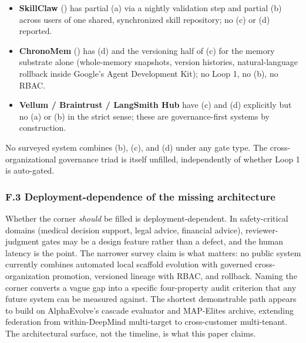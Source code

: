 \documentclass[
]{article}
\begin{document}
\begin{itemize}
  federation operator) exchange semantic skill diffs, and a server-side
  evolution agent applies, adapts, or rejects each patch per client;
  partial (c) via an auditable decision log recording source patch,
  reward, and justification per modified path; no RBAC, no (d).
\item
  \textbf{SkillClaw} ()
  has partial (a) via a nightly validation step and partial (b) across
  users of one shared, synchronized skill repository; no (c) or (d)
  reported.
\item
  \textbf{ChronoMem} ()
  has (d) and the versioning half of (c) for the memory substrate alone
  (whole-memory snapshots, version histories, natural-language rollback
  inside Google's Agent Development Kit); no Loop 1, no (b), no RBAC.
\item
  \textbf{Vellum / Braintrust / LangSmith Hub} have (c) and (d)
  explicitly but no (a) or (b) in the strict sense; these are
  governance-first systems by construction.
\end{itemize}

No surveyed system combines (b), (c), and (d) under any gate type. The
cross-organizational governance triad is itself unfilled, independently
of whether Loop 1 is auto-gated.

\subsubsection{F.3 Deployment-dependence of the missing
architecture}\label{f.3-deployment-dependence-of-the-missing-architecture}

Whether the corner \emph{should} be filled is deployment-dependent. In
safety-critical domains (medical decision support, legal advice,
financial advice), reviewer-judgment gates may be a design feature
rather than a defect, and the human latency is the point. The narrower
survey claim is what matters: no public system currently combines
automated local scaffold evolution with governed cross-organization
promotion, versioned lineage with RBAC, and rollback. Naming the corner
converts a vague gap into a specific four-property audit criterion that
any future system can be measured against. The shortest demonstrable
path appears to build on AlphaEvolve's cascade evaluator and MAP-Elites
archive, extending federation from within-DeepMind multi-target to
cross-customer multi-tenant. The architectural surface, not the
timeline, is what this paper claims.
\end{document}
